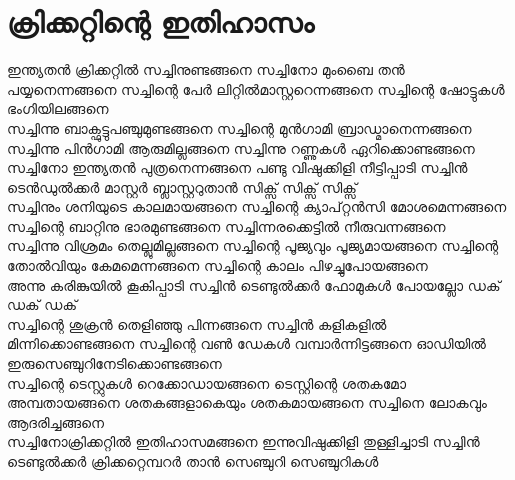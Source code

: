 \chapter{ക്രിക്കറ്റിന്റെ ഇതിഹാസം}
\obeylines  
\noindent
ഇന്ത്യതൻ ക്രിക്കറ്റിൽ സച്ചിനുണ്ടങ്ങനെ
സച്ചിനോ മുംബൈ തൻ പയ്യനെന്നങ്ങനെ
സച്ചിന്റെ പേർ ലിറ്റിൽമാസ്റ്ററെന്നങ്ങനെ
സച്ചിന്റെ ഷോട്ടുകൾ ഭംഗിയിലങ്ങനെ\\
സച്ചിന്നു ബാക്ഫുട്ടുപഞ്ചുമുണ്ടങ്ങനെ
സച്ചിന്റെ മുൻഗാമി ബ്രാഡ്മാനെന്നങ്ങനെ
സച്ചിന്നു പിൻഗാമി ആരുമില്ലങ്ങനെ
സച്ചിന്നു റണ്ണുകൾ ഏറിക്കൊണ്ടങ്ങനെ\\
സച്ചിനോ ഇന്ത്യതൻ പുത്രനെന്നങ്ങനെ
പണ്ടു വിഷുക്കിളി നീട്ടിപ്പാടി
\hspace{2em}സച്ചിൻ ടെൻഡുൽക്കർ
\hspace{2em}മാസ്റ്റർ ബ്ലാസ്റ്ററുതാൻ
\hspace{2em}സിക്സ് സിക്സ് സിക്സ്\\
സച്ചിനും ശനിയുടെ കാലമായങ്ങനെ
സച്ചിന്റെ ക്യാപ്റ്റൻസി മോശമെന്നങ്ങനെ
സച്ചിന്റെ ബാറ്റിനു ഭാരമുണ്ടങ്ങനെ
സച്ചിന്നരക്കെട്ടിൽ നീരുവന്നങ്ങനെ\\
സച്ചിന്നു വിശ്രമം തെല്ലുമില്ലങ്ങനെ
സച്ചിന്റെ പൂജ്യവും പൂജ്യമായങ്ങനെ
സച്ചിന്റെ തോൽവിയും കേമമെന്നങ്ങനെ
സച്ചിന്റെ കാലം പിഴച്ചുപോയങ്ങനെ\\
അന്നു കരിങ്കുയിൽ കൂകിപ്പാടി
\hspace{2em}സച്ചിൻ ടെണ്ടുൽക്കർ
\hspace{2em}ഫോമുകൾ പോയല്ലോ
\hspace{2em}ഡക് ഡക് ഡക്\\
സച്ചിന്റെ ശുക്രൻ തെളിഞ്ഞു പിന്നങ്ങനെ
സച്ചിൻ കളികളിൽ മിന്നിക്കൊണ്ടങ്ങനെ
സച്ചിന്റെ വൺ ഡേകൾ വമ്പാർന്നിട്ടങ്ങനെ
ഓഡിയിൽ ഇരുസെഞ്ചുറിനേടിക്കൊണ്ടങ്ങനെ\\
സച്ചിന്റെ ടെസ്റ്റുകൾ റെക്കോഡായങ്ങനെ
ടെസ്റ്റിന്റെ ശതകമോ അമ്പതായങ്ങനെ
ശതകങ്ങളാകെയും ശതകമായങ്ങനെ
സച്ചിനെ ലോകവും ആദരിച്ചങ്ങനെ\\
സച്ചിനോക്രിക്കറ്റിൽ ഇതിഹാസമങ്ങനെ
ഇന്നുവിഷുക്കിളി തുള്ളിച്ചാടി
\hspace{2em}സച്ചിൻ ടെണ്ടുൽക്കർ
\hspace{2em}ക്രിക്കറ്റെമ്പറർ താൻ
\hspace{2em}സെഞ്ചുറി സെഞ്ചുറികൾ
